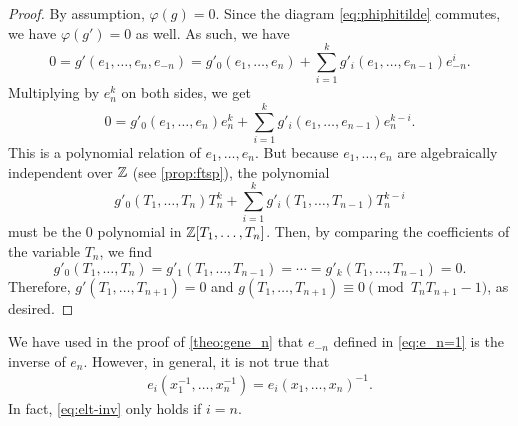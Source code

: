 \documentclass[11pt]{amsart}
\begin{document}
\begin{proof}
    
    By assumption, $\varphi(g)=0$. Since the diagram \cref{eq:phiphitilde} commutes,
    we have \(\varphi(g') = 0\) as well. As such, we have
    \[
      0 = g'(e_1,\dots,e_n,e_{-n}) = g'_0(e_1,\dots,e_n) + \sum_{i =  1}^{k}g'_i(e_1,\dots,e_{n -1})e_{-n}^i.
    \]
    Multiplying by \(e_n^{k}\) on both sides, we get
    \[
    0=g'_0(e_1,\dots,e_n)e_n^{k} + \sum_{i =  1}^{k}g'_i(e_1,\dots,e_{n -1})e_{n}^{k - i}.
    \]
    This is a polynomial relation of \(e_1,\dots,e_n\). But because \(e_1,\dots,e_n\) are algebraically independent over \(\mathbb{Z}\) (see \cref{prop:ftsp}), the polynomial
    \[
    g'_0(T_1,\dots,T_n)T_n^{k} + \sum_{i =  1}^{k}g'_i(T_1,\dots,T_{n -1})T_{n}^{k - i}
    \]
    must be the 0 polynomial in \(\mathbb{Z}[T_1,\dots,T_n]\). Then, by comparing the coefficients of the variable \(T_{n}\), we find
    \[
    g'_0(T_1,\dots,T_n) = g'_1(T_1,\dots,T_{n - 1}) = \cdots = g'_{k }(T_1,\dots,T_{n - 1}) = 0.
    \]
    Therefore, \(g'(T_1,\dots,T_{n + 1}) = 0\) and \(g(T_1,\dots,T_{n + 1}) \equiv 0 \pmod{T_nT_{n + 1} - 1}\), as desired.
\end{proof}

\begin{rem} We have used in the proof of \cref{theo:gene_n} that $e_{-n}$ defined in \cref{eq:e_n=1} is the inverse of $e_n$. However, in general, it is not true that
\begin{align}
     e_{i}(x_1^{-1}, \dots, x_n^{-1}) = e_i(x_1, \dots, x_n)^{-1}. \label{eq:elt-inv}
\end{align}
In fact, \cref{eq:elt-inv} only holds if $i = n$. 
\end{rem}
\end{document}
